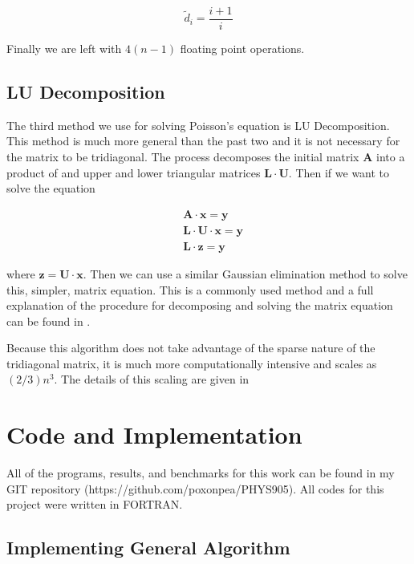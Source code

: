 \documentclass[%
oneside,                 %
final,                   %
10pt]{article}
\begin{document}
\begin{equation*}
\tilde{d}_i=\frac{i+1}{i}
\end{equation*}

Finally we are left with $4(n-1)$ floating point operations.

\subsection{LU Decomposition}

The third method we use for solving Poisson's equation is LU Decomposition.  This method is much more general than the past two and it is not necessary for the matrix to be tridiagonal. The process decomposes the initial matrix $\mathbf{A}$ into a product of and upper and lower triangular matrices $\mathbf{L} \cdot \mathbf{U}$.  Then if we want to solve the equation

\begin{equation*}
\begin{split}
&\mathbf{A} \cdot \mathbf{x} = \mathbf{y} \\
&\mathbf{L} \cdot \mathbf{U} \cdot \mathbf{x} = \mathbf{y}\\
& \mathbf{L} \cdot \mathbf{z} = \mathbf{y}
\end{split}
\end{equation*}

where $\mathbf{z}=\mathbf{U} \cdot \mathbf{x}$.  Then we can use a similar Gaussian elimination method to solve this, simpler, matrix equation.  This is a commonly used method and a full explanation of the procedure for decomposing and solving the matrix equation can be found in \cite{LectureNotes}.

Because this algorithm does not take advantage of the sparse nature of the tridiagonal matrix, it is much more computationally intensive and scales as $(2/3) n^3$.  The details of this scaling are given in \cite{Chiarandini}


\section{Code and Implementation}

All of the programs, results, and benchmarks for this work can be found in my GIT repository (https://github.com/poxonpea/PHYS905).  All codes for this project were written in FORTRAN.

\subsection{Implementing General Algorithm}
\end{document}
